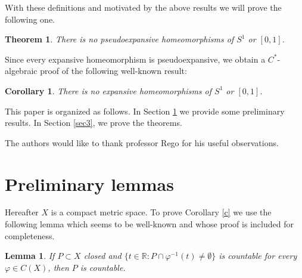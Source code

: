 \documentclass[11pt,letterpaper]{amsart}
\newtheorem{theorem}{Theorem}
\newtheorem{cor}{Corollary}
\newtheorem{lem}{Lemma}
\begin{document}
With these definitions and motivated by the above results we will prove the following one.

\begin{theorem}
\label{furia}
There is no pseudoexpansive homeomorphisms of $S^1$ or $[0,1]$.
\end{theorem}

Since every expansive homeomorphism is pseudoexpansive,
we obtain a $C^*$-algebraic proof of the following well-known result:

\begin{cor}
There is no expansive homeomorphisms of $S^1$ or $[0,1]$.
\end{cor}


This paper is organized as follows. In Section \ref{sec2} we provide some preliminary results. In Section \ref{sec3}, we prove the theorems.

The authors would like to thank professor Rego for his useful observations.









\section{Preliminary lemmas}
\label{sec2}














\noindent
Hereafter $X$ is a compact metric space.
To prove Corollary \ref{c} we use the following lemma which seems to be well-known and whose proof is included for completeness.

\begin{lem}
\label{passagem}
If $P\subset X$ closed and
$\{t\in\mathbb{R} : P\cap \varphi^{-1}(t)\neq\emptyset\}$
is countable for every $\varphi\in C(X)$, then $P$ is countable.
\end{lem}
\end{document}
